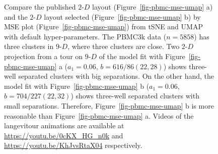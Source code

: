 \documentclass[
  12pt]{article}
\newcommand\gD{$2\text{-}D$}
\begin{document}
\begin{figure}[H]


\caption{\label{fig-model-pbmc-author-proj}Compare the published \gD{}
layout (Figure~\ref{fig-pbmc-mse-umap} a) and the \gD{} layout selected
(Figure~\ref{fig-pbmc-mse-umap} b) by MSE plot
(Figure~\ref{fig-pbmc-mse-umap}) from tSNE and UMAP with default
hyper-parameters. The PBMC3k data (\(n =  5858\)) has three clusters in
\(9\text{-}D\), where three clusters are close. Two \gD{} projection
from a tour on \(9\text{-}D\) of the model fit with
Figure~\ref{fig-pbmc-mse-umap} a (\(a_1 = 0.06\),
\(b = 616/86 (22, 28)\)) shows three-well separated clusters with big
separations. On the other hand, the model fit with
Figure~\ref{fig-pbmc-mse-umap} b (\(a_1 = 0.06\),
\(b = 704/227 (22, 32)\)) shows three-well separated clusters with small
separations. Therefore, Figure~\ref{fig-pbmc-mse-umap} b is more
reasonable than Figure~\ref{fig-pbmc-mse-umap} a. Videos of the
langevitour animations are available at
\url{https://youtu.be/0cKX_HG_n0k} and
\url{https://youtu.be/KhJvsRtaX04} respectively.}

\end{figure}%


  
\end{document}
